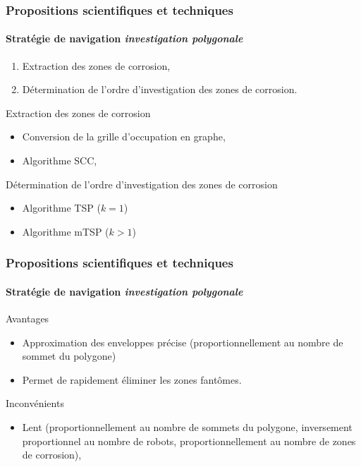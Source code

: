 \documentclass{beamer}
\begin{document}
			\begin{frame}
				\frametitle{Propositions scientifiques et techniques}
				\framesubtitle{Stratégie de navigation \textit{investigation polygonale}}
				\begin{enumerate}
					\item Extraction des zones de corrosion,
					\item Détermination de l'ordre d'investigation des zones de corrosion.
				\end{enumerate}
				\begin{block}{Extraction des zones de corrosion}
					\begin{itemize}
						\item Conversion de la grille d'occupation en graphe,
						\item Algorithme SCC,
					\end{itemize}
				\end{block}
				\begin{block}{Détermination de l'ordre d'investigation des zones de corrosion}
					\begin{itemize}
						\item Algorithme TSP ($k = 1$)
						\item Algorithme mTSP ($k > 1$)
					\end{itemize}
				\end{block}
			\end{frame}
			\begin{frame}
				\frametitle{Propositions scientifiques et techniques}
				\framesubtitle{Stratégie de navigation \textit{investigation polygonale}}
				\begin{exampleblock}{Avantages}
					\begin{itemize}
						\item Approximation des enveloppes précise (proportionnellement au nombre de sommet du polygone)
						\item Permet de rapidement éliminer les zones fantômes.
					\end{itemize}
				\end{exampleblock}
				\begin{alertblock}{Inconvénients}
					\begin{itemize}
						\item Lent (proportionnellement au nombre de sommets du polygone, inversement proportionnel au nombre de robots, proportionnellement au nombre de zones de corrosion),
					\end{itemize}
				\end{alertblock}
			\end{frame}
\end{document}
